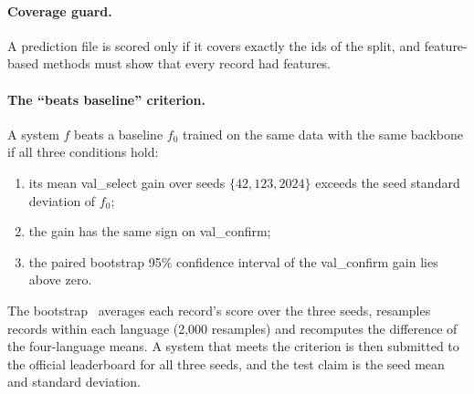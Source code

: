 \paragraph{Coverage guard.}
A prediction file is scored only if it covers exactly the ids of the split, and feature-based methods must show that every record had features.

\paragraph{The ``beats baseline'' criterion.}
A system $f$ beats a baseline $f_0$ trained on the same data with the same backbone if all three conditions hold:
\begin{enumerate}
    \item[(a)] its mean val\_select gain over seeds $\{42, 123, 2024\}$ exceeds the seed standard deviation of $f_0$;
    \item[(b)] the gain has the same sign on val\_confirm;
    \item[(c)] the paired bootstrap 95\% confidence interval of the val\_confirm gain lies above zero.
\end{enumerate}
The bootstrap~\cite{efron1993bootstrap} averages each record's score over the three seeds, resamples records within each language (2,000 resamples) and recomputes the difference of the four-language means. A system that meets the criterion is then submitted to the official leaderboard for all three seeds, and the test claim is the seed mean and standard deviation.
